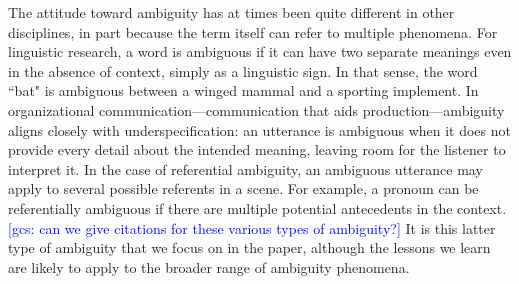 \documentclass[11pt,a4paper]{article}
\newcommand{\gcs}[1]{\textcolor{blue}{[gcs: #1]}}
\begin{document}
The attitude toward ambiguity has at times been quite different in other disciplines, in part because the term itself can refer to multiple phenomena. For linguistic research, a word is ambiguous if it can have two separate meanings even in the absence of context, simply as a linguistic sign. In that sense, the word ``bat" is ambiguous between a winged mammal and a sporting implement. In organizational communication---communication that aids production---ambiguity aligns closely with underspecification: an utterance is ambiguous when it does not provide every detail about the intended meaning, leaving room for the listener to interpret it. In the case of referential ambiguity, an ambiguous utterance may apply to several possible referents in a scene. For example, a pronoun can be referentially ambiguous if there are multiple potential antecedents in the context. \gcs{can we give citations for these various types of ambiguity?} It is this latter type of ambiguity that we focus on in the paper, although the lessons we learn are likely to apply to the broader range of ambiguity phenomena.


\end{document}
